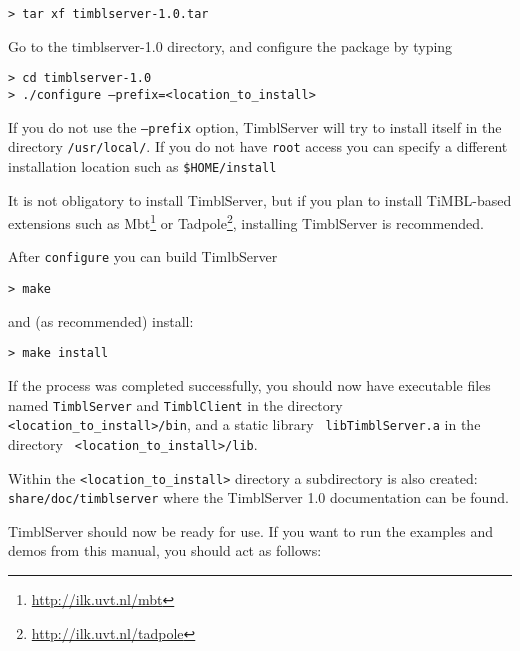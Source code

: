 \documentclass{report}
\begin{document}
{\tt > tar xf timblserver-1.0.tar}

Go to the timblserver-1.0 directory, and configure the package by typing

{\tt > cd timblserver-1.0} \\
{\tt > ./configure --prefix=<location\_to\_install>}

If you do not use the {\tt --prefix} option, TimblServer will try to
install itself in the directory {\tt /usr/local/}.  If you do not have
{\tt root} access you can specify a different installation location
such as {\tt \$HOME/install}

It is not obligatory to install TimblServer, but if you plan to
install TiMBL-based extensions such as
Mbt\footnote{\url{http://ilk.uvt.nl/mbt}} or
Tadpole\footnote{\url{http://ilk.uvt.nl/tadpole}}, installing
TimblServer is recommended.

After {\tt configure} you can build TimlbServer

{\tt > make}

and (as recommended) install:

{\tt > make install }

If the process was completed successfully, you should now have
executable files named {\tt TimblServer} and {\tt TimblClient} in the
directory {\tt <location\_to\_install>/bin}, and a static library {\tt
  libTimblServer.a} in the directory {\tt
  <location\_to\_install>/lib}.

Within the {\tt <location\_to\_install>} directory a subdirectory is
also created: {\tt share/doc/timblserver} where the TimblServer 1.0
documentation can be found.

TimblServer should now be ready for use. If you want to run the
examples and demos from this manual, you should act as follows:
\end{document}
